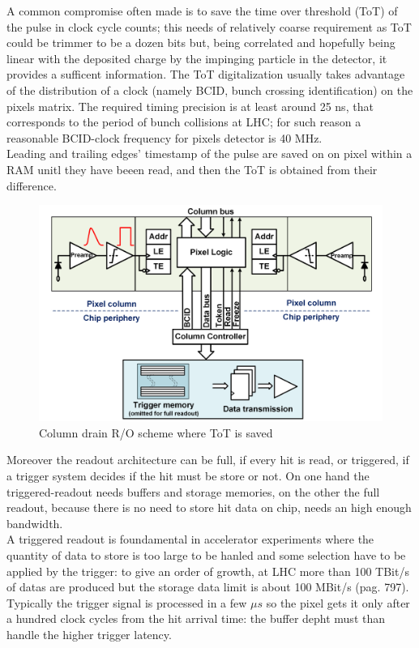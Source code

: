    A common compromise often made is to save the time over threshold (ToT) of the pulse in clock cycle counts; this needs of relatively coarse requirement as ToT could be trimmer to be a dozen bits but, being correlated and hopefully being linear with the deposited charge by the impinging particle in the detector, it provides a sufficent information.
   The ToT digitalization usually takes advantage of the distribution of a clock (namely BCID,  bunch crossing identification) on the pixels matrix. The required timing precision is at least around 25 ns, that corresponds to the period of bunch collisions at LHC; for such reason a reasonable BCID-clock frequency for pixels detector is 40 MHz.\\
   Leading and trailing edges' timestamp of the pulse are saved on on pixel within a RAM unitl they have beeen read,  and then the ToT is obtained from their difference.
   \begin{figure}[h!]
      \centering
      \includegraphics[width=.7\linewidth]{figures/Pixel_detectors/column_drain_RO.png}
      \caption{Column drain R/O scheme where ToT is saved}
      \label{fig:column_drain_RO-like}
   \end{figure}

   Moreover the readout architecture can be full, if every hit is read, or triggered, if a trigger system decides if the hit must be store or not. On one hand the triggered-readout needs buffers and storage memories, on the other the full readout, because there is no need to store hit data on chip, needs an high enough bandwidth.\\
   A triggered readout is foundamental in accelerator experiments where the quantity of data to store is too large to be hanled and some selection have to be applied by the trigger: to give an order of growth, at LHC more than 100 TBit/s of datas are produced but the storage data limit is about 100 MBit/s \cite{K-Wermes} (pag. 797).\\
   Typically the trigger signal is processed in a few $\mu s$ so the pixel gets it only after a hundred clock cycles from the hit arrival time: the buffer depht must than handle the higher trigger latency. 
 
